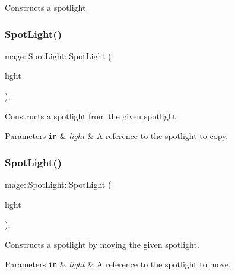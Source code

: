 Constructs a spotlight. \hypertarget{classmage_1_1_spot_light_a93287b22630e43766fdab04e0c235a30}{}\label{classmage_1_1_spot_light_a93287b22630e43766fdab04e0c235a30} 
\subsubsection{\texorpdfstring{Spot\+Light()}{SpotLight()}\hspace{0.1cm}{\footnotesize\ttfamily [2/3]}}
{\footnotesize\ttfamily mage\+::\+Spot\+Light\+::\+Spot\+Light (\begin{DoxyParamCaption}\item[{const \hyperlink{classmage_1_1_spot_light}{Spot\+Light} \&}]{light }\end{DoxyParamCaption})\hspace{0.3cm}{\ttfamily [default]}, {\ttfamily [noexcept]}}

Constructs a spotlight from the given spotlight.


\begin{DoxyParams}[1]{Parameters}
\mbox{\tt in}  & {\em light} & A reference to the spotlight to copy. \\
\hline
\end{DoxyParams}
\hypertarget{classmage_1_1_spot_light_a694e2e49340440515438a86baa284431}{}\label{classmage_1_1_spot_light_a694e2e49340440515438a86baa284431} 
\subsubsection{\texorpdfstring{Spot\+Light()}{SpotLight()}\hspace{0.1cm}{\footnotesize\ttfamily [3/3]}}
{\footnotesize\ttfamily mage\+::\+Spot\+Light\+::\+Spot\+Light (\begin{DoxyParamCaption}\item[{\hyperlink{classmage_1_1_spot_light}{Spot\+Light} \&\&}]{light }\end{DoxyParamCaption})\hspace{0.3cm}{\ttfamily [default]}, {\ttfamily [noexcept]}}

Constructs a spotlight by moving the given spotlight.


\begin{DoxyParams}[1]{Parameters}
\mbox{\tt in}  & {\em light} & A reference to the spotlight to move. \\
\hline
\end{DoxyParams}
\hypertarget{classmage_1_1_spot_light_aeeaba91c6448102ac6a23587c5366808}{}\label{classmage_1_1_spot_light_aeeaba91c6448102ac6a23587c5366808} 

